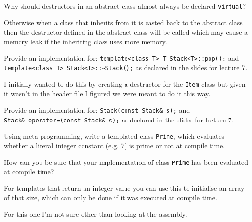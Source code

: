 \documentclass{supervision}
\begin{document}
\begin{questions}
      \begin{solution}
      \end{solution}

    \question Why should destructors in an abstract class almost always be
      declared \lstinline|virtual|?
      \begin{solution}
        Otherwise when a class that inherits from it is casted back to the
        abstract class then the destructor defined in the abstract class will
        be called which may cause a memory leak if the inheriting class uses
        more memory.
      \end{solution}

    \question Provide an implementation for:
      \lstinline|template<class T> T Stack<T>::pop();| and
      \lstinline|template<class T> Stack<T>::~Stack();| as declared in the
      slides for lecture 7.
      \begin{solution}
        I initially wanted to do this by creating a destructor for the
        \lstinline|Item| class but given it wasn't in the header file I
        figured we were meant to do it this way.
      \end{solution}

    \question Provide an implementation for: \lstinline|Stack(const Stack& s);|
      and \\ \lstinline|Stack& operator=(const Stack& s);| as declared in the
      slides for lecture 7.
    \begin{solution}
    \end{solution}

    \question Using meta programming, write a templated class
      \lstinline|Prime|, which evaluates whether a literal integer constant
      (e.g. $7$) is prime or not at compile time.
      \begin{solution}
      \end{solution}

    \question How can you be sure that your implementation of class
      \lstinline|Prime| has been evaluated at compile time?
      \begin{solution}
        For templates that return an integer value you can use this to
        initialise an array of that size, which can only be done if it was
        executed at compile time.

        For this one I'm not sure other than looking at the assembly.
      \end{solution}


\end{questions}
\end{document}
